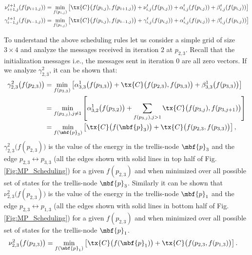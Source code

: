 \documentclass[journal, onecolumn]{IEEEtran}
\begin{document}
\begin{align}
\nu_{i+1,j}^{t+1}(f(p_{i+1,j}))&=\min_{f(p_{i,j})}\left[\tx{C}\big(f(p_{i,j}),f(p_{i+1,j})\big)+\nu_{i,j}^{t}(f(p_{i,j})) +\alpha_{i,j}^{t}(f(p_{i,j})) + \beta_{i,j}^{t}(f(p_{i,j}))\right]\notag\\
\gamma_{i-1,j}^{t+1}(f(p_{i-1,j}))&=\min_{f(p_{i,j})}\left[\tx{C}\big(f(p_{i,j}),f(p_{i-1,j})\big)+\gamma_{i,j}^{t}(f(p_{i,j})) +\alpha_{i,j}^{t}(f(p_{i,j})) + \beta_{i,j}^{t}(f(p_{i,j}))\right]\label{Eqn:MessagePassingRules}
\end{align}


To understand the above scheduling rules let us consider a simple grid of size $3 \times 4$ and analyze the messages received in iteration $2$ at $p_{2,3}$. %
Recall that the initialization messages i.e., the messages sent in iteration $0$ are all zero vectors. If we analyze $\gamma_{2,3}^{2}$, it can be shown that:
\begin{align}
\gamma_{2,3}^{2}\big(f(p_{2,3})\big)&=\min_{f(p_{3,3})}\left[\alpha^{1}_{3,3}\big(f(p_{3,3})\big)+\tx{C}\big(f(p_{2,3}),f(p_{3,3})\big)+\beta^{1}_{3,3}\big(f(p_{3,3})\big)\right]\notag\\
                            &=\min_{f(p_{3,j}),j\neq 1}\left[\alpha^{1}_{3,2}\big(f(p_{3,2})\big)+\sum_{f(p_{3,j}),j> 1}\tx{C}\big( f(p_{3,j}),f(p_{3,j+1})\big)\right]\notag\\
							 &=\min_{f(\mbf{p}_{3})}\left[\tx{C}\big(f(\mbf{p}_{3})\big)+\tx{C}\big(f(p_{2,3},f(p_{3,3})\big)\right]\label{Eqn:OptimalGamma},
\end{align}
 $\gamma_{2,3}^{2}\big(f(p_{2,3})\big)$ is the value of the energy in the trellis-node $\mbf{p}_{3}$ and the edge $p_{2,3}\leftrightarrow p_{3,3}$ (all the edges shown with solid lines in top half of Fig. \ref{Fig:MP_Scheduling}) for a given $f(p_{2,3})$ and when minimized over all possible set of states for the trellis-node $\mbf{p}_{3}$. Similarly it can be shown that  $\nu_{2,3}^{2}\big(f(p_{2,3})\big)$ is the value of the energy in the trellis-node $\mbf{p}_{1}$ and the edge $p_{2,3}\leftrightarrow p_{1,3}$ (all the edges shown with solid lines in bottom half of Fig. \ref{Fig:MP_Scheduling}) for a given $f(p_{2,3})$ and when minimized over all possible set of states for the trellis-node $\mbf{p}_{1}$.
 \begin{align}
\nu_{2,3}^{2}\big(f(p_{2,3})\big) &=\min_{f(\mbf{p}_{1})}\left[\tx{C}\big(f(\mbf{p}_{1})\big)+\tx{C}\big(f(p_{2,3},f(p_{1,3})\big)\right].\label{Eqn:OptimalNu}
 \end{align}
\end{document}
